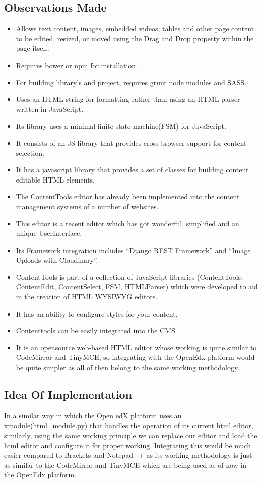 \subsection{Observations Made}
\begin{itemize}
\item Allows text content, images, embedded videos, tables and other page content to be
edited, resized, or moved using the Drag and Drop property within the page itself.
\item Requires bower or npm for installation.
\item For building library’s and project, requires grunt node modules and SASS.
\item Uses an HTML string for formatting rather than using an HTML parser written in
JavaScript.
\item Its library uses a minimal finite state machine(FSM) for JavaScript.
\item It consists of an JS library that provides cross-browser support for content selection.
\item It has a javascript library that provides a set of classes for building content editable
HTML elements.
\item The ContentTools editor has already been implemented into the content management
systems of a number of websites.
\item This editor is a recent editor which has got wonderful, simplified and an unique
UserInterface.
\item Its Framework integration includes “Django REST Framework” and “Image
Uploads with Cloudinary”.
\item ContentTools is part of a collection of JavaScript libraries (ContentTools,
ContentEdit, ContentSelect, FSM, HTMLParser) which were developed to aid in the
creation of HTML WYSIWYG editors.
\item It has an ability to configure styles for your content.
\item Contenttools can be easily integrated into the CMS.
\item It is an opensource web-based HTML editor whose working is quite similar to
CodeMirror and TinyMCE, so integrating with the OpenEdx platform would be
quite simpler as all of then belong to the same working methodology.
\end{itemize}
\subsection{Idea Of Implementation}
In a similar way in which the Open edX platform uses an xmodule(html\_module.py) that
handles the operation of its current html editor, similarly, using the same working principle
we can replace our editor and load the html editor and configure it for proper working.  \newline
\newline
Integrating this would be much easier compared to Brackets and Notepad++ as its working
methodology is just as similar to the CodeMirror and TinyMCE which are being used as of
now in the OpenEdx platform. \newline
